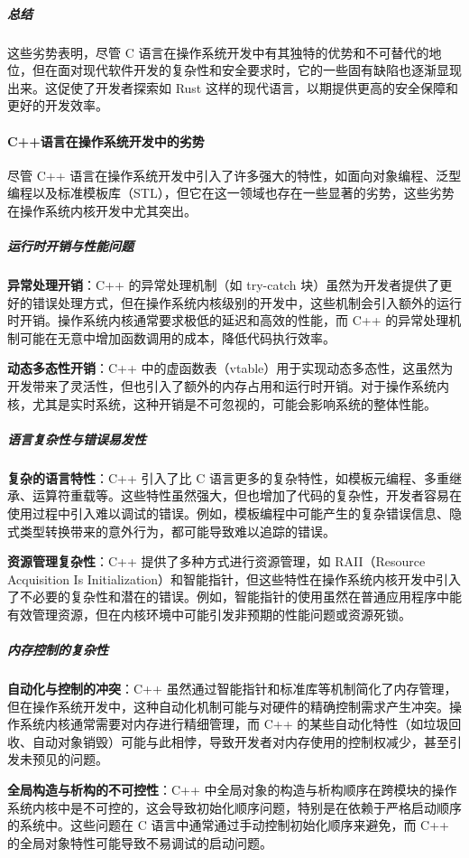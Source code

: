 \subparagraph{总结}

这些劣势表明，尽管 C 语言在操作系统开发中有其独特的优势和不可替代的地位，但在面对现代软件开发的复杂性和安全要求时，它的一些固有缺陷也逐渐显现出来。这促使了开发者探索如 Rust 这样的现代语言，以期提供更高的安全保障和更好的开发效率。

\paragraph{C++语言在操作系统开发中的劣势}

尽管 C++ 语言在操作系统开发中引入了许多强大的特性，如面向对象编程、泛型编程以及标准模板库（STL），但它在这一领域也存在一些显著的劣势，这些劣势在操作系统内核开发中尤其突出。

\subparagraph{运行时开销与性能问题}

\textbf{异常处理开销}：C++ 的异常处理机制（如 try-catch 块）虽然为开发者提供了更好的错误处理方式，但在操作系统内核级别的开发中，这些机制会引入额外的运行时开销。操作系统内核通常要求极低的延迟和高效的性能，而 C++ 的异常处理机制可能在无意中增加函数调用的成本，降低代码执行效率。

\textbf{动态多态性开销}：C++ 中的虚函数表（vtable）用于实现动态多态性，这虽然为开发带来了灵活性，但也引入了额外的内存占用和运行时开销。对于操作系统内核，尤其是实时系统，这种开销是不可忽视的，可能会影响系统的整体性能。

\subparagraph{语言复杂性与错误易发性}

\textbf{复杂的语言特性}：C++ 引入了比 C 语言更多的复杂特性，如模板元编程、多重继承、运算符重载等。这些特性虽然强大，但也增加了代码的复杂性，开发者容易在使用过程中引入难以调试的错误。例如，模板编程中可能产生的复杂错误信息、隐式类型转换带来的意外行为，都可能导致难以追踪的错误。

\textbf{资源管理复杂性}：C++ 提供了多种方式进行资源管理，如 RAII（Resource Acquisition Is Initialization）和智能指针，但这些特性在操作系统内核开发中引入了不必要的复杂性和潜在的错误。例如，智能指针的使用虽然在普通应用程序中能有效管理资源，但在内核环境中可能引发非预期的性能问题或资源死锁。

\subparagraph{内存控制的复杂性}

\textbf{自动化与控制的冲突}：C++ 虽然通过智能指针和标准库等机制简化了内存管理，但在操作系统开发中，这种自动化机制可能与对硬件的精确控制需求产生冲突。操作系统内核通常需要对内存进行精细管理，而 C++ 的某些自动化特性（如垃圾回收、自动对象销毁）可能与此相悖，导致开发者对内存使用的控制权减少，甚至引发未预见的问题。

\textbf{全局构造与析构的不可控性}：C++ 中全局对象的构造与析构顺序在跨模块的操作系统内核中是不可控的，这会导致初始化顺序问题，特别是在依赖于严格启动顺序的系统中。这些问题在 C 语言中通常通过手动控制初始化顺序来避免，而 C++ 的全局对象特性可能导致不易调试的启动问题。


